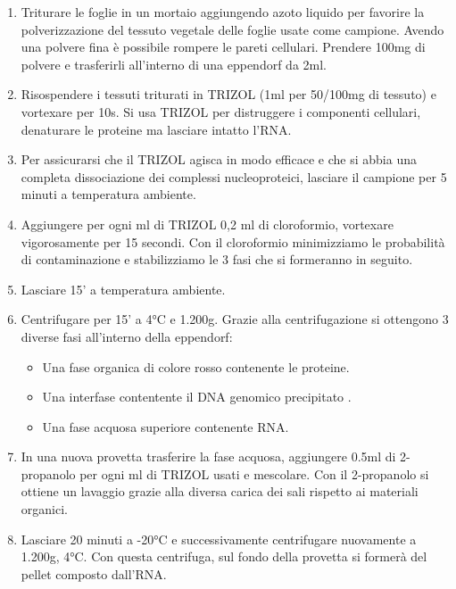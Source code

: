 \begin{enumerate}
\item Triturare le foglie in un mortaio aggiungendo azoto liquido per favorire
la polverizzazione del tessuto vegetale delle foglie usate come campione.
Avendo una polvere fina \`e possibile rompere le pareti cellulari.
Prendere 100mg di polvere e trasferirli all’interno di una eppendorf da 2ml.

\item Risospendere i tessuti triturati in TRIZOL (1ml per 50/100mg di tessuto)
e vortexare per 10s.
Si usa TRIZOL per distruggere i componenti cellulari, denaturare le proteine ma lasciare intatto l’RNA.

\item Per assicurarsi che il TRIZOL agisca in modo efficace e che si abbia una completa
dissociazione dei complessi nucleoproteici, lasciare il campione per 5 minuti a
temperatura ambiente.

\item Aggiungere per ogni ml di TRIZOL 0,2 ml di cloroformio,
vortexare vigorosamente per 15 secondi.
Con il cloroformio minimizziamo le probabilità di contaminazione e stabilizziamo
le 3 fasi che si formeranno in seguito.

\item Lasciare 15’ a temperatura ambiente.

\item Centrifugare per 15’ a 4°C e 1.200g. Grazie alla centrifugazione si ottengono
3 diverse fasi all’interno della eppendorf:
	\begin{itemize}
	\item Una fase organica di colore rosso contenente le proteine.
	\item Una interfase contentente il DNA genomico precipitato	.
	\item Una fase acquosa superiore contenente RNA.
	\end{itemize}

\item In una nuova provetta trasferire la fase acquosa, aggiungere 0.5ml di 2-propanolo
per ogni ml di TRIZOL usati e mescolare. Con il 2-propanolo si ottiene un lavaggio grazie
alla diversa carica dei sali rispetto ai materiali organici.

\item Lasciare 20 minuti a -20°C e successivamente centrifugare nuovamente a 1.200g, 4°C.
Con questa centrifuga, sul fondo della provetta si formerà del pellet composto dall’RNA.


\end{enumerate}
